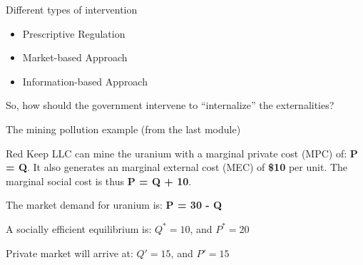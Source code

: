\begin{frame}{Different types of intervention}
\protect\hypertarget{different-types-of-intervention}{}

\begin{itemize}
\tightlist
\item
  Prescriptive Regulation
\item
  Market-based Approach
\item
  Information-based Approach
\end{itemize}

\end{frame}

\begin{frame}{}
\protect\hypertarget{section-2}{}

So, how should the government intervene to ``internalize'' the
externalities?

\end{frame}

\begin{frame}{The mining pollution example (from the last module)}
\protect\hypertarget{the-mining-pollution-example-from-the-last-module}{}

Red Keep LLC can mine the uranium with a marginal private cost (MPC) of:
\textbf{P = Q}. It also generates an marginal external cost (MEC) of
\textbf{\$10} per unit. The marginal social cost is thus \textbf{P = Q +
10}.

The market demand for uranium is: \textbf{P = 30 - Q}

\end{frame}

\begin{frame}{}
\protect\hypertarget{section-3}{}

A socially efficient equilibrium is: \(Q^* = 10\), and \(P^* = 20\)

Private market will arrive at: \(Q' = 15\), and \(P' = 15\)

\end{frame}

